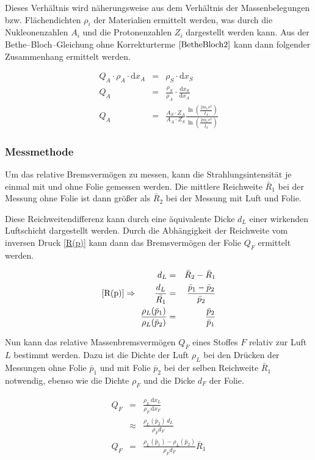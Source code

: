 \documentclass[12pt,a4paper]{scrartcl}
\numberwithin{equation}{section} %
\begin{document}
\noindent
Dieses Verhältnis wird näherungsweise aus dem Verhältnis der Massenbelegungen bzw. Flächendichten $\rho_i$ der Materialien ermittelt werden, was durch die Nukleonenzahlen $A_i$ und die Protonenzahlen $Z_i$ dargestellt werden kann. Aus der Bethe--Bloch--Gleichung ohne Korrekturterme $\eqref{BetheBloch2}$ kann dann folgender Zusammenhang ermittelt werden.

\begin{eqnarray}
	Q_A \cdot \rho_A \cdot \mathrm dx_A
	&=& \rho_S \cdot \mathrm dx_S \\
	Q_A &=& \frac{\rho_S}{\rho_A} \cdot \frac{\mathrm dx_S}{\mathrm dx_A} \\
	Q_A &=& \frac{A_S\cdot Z_A}{A_A\cdot Z_S}
	\frac{\ln\left(\frac{2m_ev^2}{\bar I_A}\right)}{\ln\left(\frac{2m_ev^2}{\bar I_S}\right)}
\end{eqnarray}

\hypertarget{messmethode}{\subsubsection{Messmethode}\label{messmethode}}
Um das relative Bremsvermögen zu messen, kann die Strahlungsintensität je einmal mit und ohne Folie gemessen werden. Die mittlere Reichweite $\bar R_1$ bei der Messung ohne Folie ist dann größer als $\bar R_2$ bei der Messung mit Luft und Folie.

Diese Reichweitendifferenz kann durch eine äquivalente Dicke $d_L$ einer wirkenden Luftschicht dargestellt werden. Durch die Abhängigkeit der Reichweite vom inversen Druck \eqref{R(p)} kann dann das Bremsvermögen der Folie $Q_F$ ermittelt werden.

\begin{eqnarray}
	d_L &=& \bar R_2 - \bar R_1 \\
	\eqref{R(p)} \Rightarrow \qquad
	\frac{d_L}{\bar{R_1}} &=& \frac{\bar p_1 - \bar p_2}{\bar p_2} \\
	\frac{\rho_L(\bar p_1)}{\rho_L(\bar p_2)} &=& \frac{\bar p_2}{\bar p_1}
\end{eqnarray}

\noindent
Nun kann das relative Massenbremsvermögen $Q_F$ eines Stoffes $F$ relativ zur Luft $L$ bestimmt werden. Dazu ist die Dichte der Luft $\rho_L$ bei den Drücken der Messungen ohne Folie $\bar p_1$ und mit Folie $\bar p_2$ bei der selben Reichweite $\bar R_1$ notwendig, ebenso wie die Dichte $\rho_F$ und die Dicke $d_F$ der Folie.

\begin{eqnarray}
	Q_F &=& \frac{\rho_L \,\mathrm dx_L}{\rho_F \,\mathrm dx_F} \\
	&\approx& \frac{\rho_L(\bar p_2) \, d_L}{\rho_F d_F} \\
	Q_F &=& \frac{\rho_L(\bar{p}_1) - \rho_L(\bar{p}_2)}{\rho_F d_F} \bar{R}_1
	\label{eq:Q_F}
\end{eqnarray}
\end{document}
